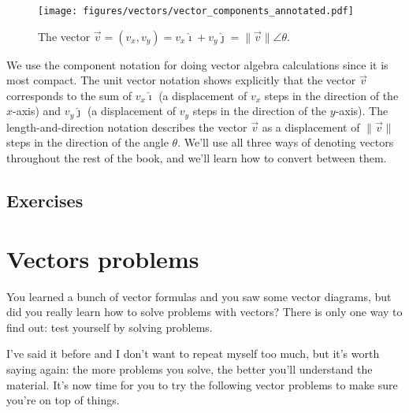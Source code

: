 			\begin{figure}[htb]
				\centering
				\texttt{[image: figures/vectors/vector\_components\_annotated.pdf]}
				\vspace{-2mm}
				\caption{The vector $\vec{v}=(v_x,v_y) = v_x\hat{\imath}+ v_y\hat{\jmath} = \|\vec{v}\|\angle \theta$.}
				\label{fig:vector_components_annotated}
			\end{figure}

			\noindent
			We use the component notation for doing vector algebra calculations since it is most compact.
			The unit vector notation shows explicitly that the vector $\vec{v}$ corresponds to the sum of
			$v_x\hat{\imath}$ (a displacement of $v_x$ steps in the direction of the $x$-axis)
			and $v_y\hat{\jmath}$ (a displacement of $v_y$ steps in the direction of the $y$-axis).
			The length-and-direction notation describes the vector $\vec{v}$
			as a displacement of $\|\vec{v}\|$ steps in the direction of the angle $\theta$.
			We'll use all three ways of denoting vectors throughout the rest of the book,
			and we'll learn how to convert between them.


	\subsection{Exercises}
	\label{basis:exercises}

		


\section{Vectors problems}
\label{sec:vec_problems}

\vspace{-2mm}

You learned a bunch of vector formulas and you saw some vector diagrams,
but did you really learn how to solve problems with vectors?
There is only one way to find out: test yourself by solving problems.

I've said it before and I don't want to repeat myself too much,
but it's worth saying again: the more problems you solve, the better you'll understand the material.
It's now time for you to try the following vector problems to make sure you're on top of things.

\medskip

